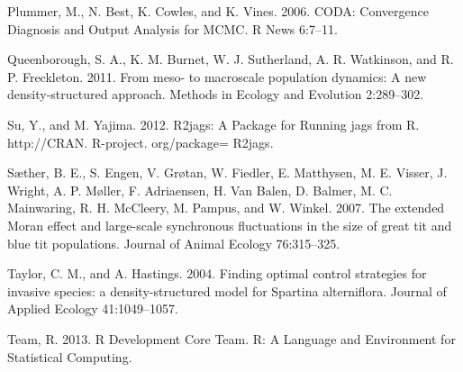 \documentclass[12pt,]{article}
\begin{document}
Plummer, M., N. Best, K. Cowles, and K. Vines. 2006. CODA: Convergence
Diagnosis and Output Analysis for MCMC. R News 6:7--11.

Queenborough, S. A., K. M. Burnet, W. J. Sutherland, A. R. Watkinson,
and R. P. Freckleton. 2011. From meso- to macroscale population
dynamics: A new density-structured approach. Methods in Ecology and
Evolution 2:289--302.

Su, Y., and M. Yajima. 2012. R2jags: A Package for Running jags from R.
http://CRAN. R-project. org/package= R2jags.

Sæther, B. E., S. Engen, V. Grøtan, W. Fiedler, E. Matthysen, M. E.
Visser, J. Wright, A. P. Møller, F. Adriaensen, H. {Van Balen}, D.
Balmer, M. C. Mainwaring, R. H. McCleery, M. Pampus, and W. Winkel.
2007. The extended Moran effect and large-scale synchronous fluctuations
in the size of great tit and blue tit populations. Journal of Animal
Ecology 76:315--325.

Taylor, C. M., and A. Hastings. 2004. Finding optimal control strategies
for invasive species: a density-structured model for Spartina
alterniflora. Journal of Applied Ecology 41:1049--1057.

Team, R. 2013. R Development Core Team. R: A Language and Environment
for Statistical Computing.
\end{document}
